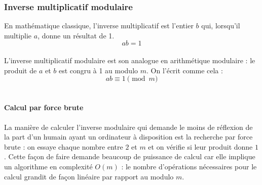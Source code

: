 \documentclass[10pt,a4paper,twoside]{article}
\numberwithin{equation}{section}
\begin{document}
		\subsubsection{Inverse multiplicatif modulaire} \label{inverse}
			En mathématique classique, l'inverse multiplicatif est l'entier $b$ qui, lorsqu'il multiplie $a$, donne un résultat de 1.
			\begin{equation}
				ab = 1
			\end{equation}\\
			
			L'inverse multiplicatif modulaire est son analogue en arithmétique modulaire : le produit de $a$ et $b$ est congru à 1 au modulo $m$. On l'écrit comme cela :
			\begin{equation}
				ab \equiv 1 \pmod m
			\end{equation}\\
			
			\paragraph{Calcul par force brute} La manière de calculer l'inverse modulaire qui demande le moins de réflexion de la part d'un humain ayant un ordinateur à disposition est la recherche par force brute : on essaye chaque nombre entre $2$ et $m$ et on vérifie si leur produit donne $1$. Cette façon de faire demande beaucoup de puissance de calcul car elle implique un algorithme en complexité $O(m)$ : le nombre d'opérations nécessaires pour le calcul grandit de façon linéaire par rapport au modulo $m$.
			
\end{document}
